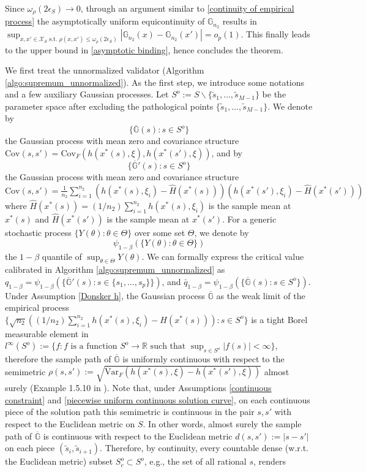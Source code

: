\documentclass[mnsc,blindrev]{informs4} %
\newcommand{\R}{\mathbb{R}}
\newcommand{\abs}[1]{\left \vert #1 \right\vert}
\begin{document}
Since $\omega_{\rho}(2\epsilon_S)\to 0$, through an argument similar to \eqref{continuity of empirical process} the asymptotically uniform equicontinuity of $\mathbb G_{n_2}$ results in $\sup_{x,x'\in\mathcal X_S\text{ s.t. }\rho(x,x')\leq \omega_{\rho}(2\epsilon_S)}\abs{\mathbb G_{n_2}(x)-\mathbb G_{n_2}(x')}=o_p(1)$. This finally leads to the upper bound in \eqref{asymptotic binding}, hence concludes the theorem.\hfill\Halmos

We first treat the unnormalized validator (Algorithm \ref{algo:supremum_unnormalized}). As the first step, we introduce some notations and a few auxiliary Gaussian processes. Let $S^o:=S\backslash\{\tilde s_1,\ldots,\tilde s_{M-1}\}$ be the parameter space after excluding the pathological points $\{\tilde s_1,\ldots,\tilde s_{M-1}\}$. We denote by
$$\{\overline{\mathbb G}(s):s\in S^o\}$$
the Gaussian process with mean zero and covariance structure $\mathrm{Cov}(s,s')=\mathrm{Cov}_F(h(x^*(s),\xi),h(x^*(s'),\xi))$, and by
$$\{\overline{\mathbb G}'(s):s\in S^o\}$$
the Gaussian process with mean zero and covariance structure $\mathrm{Cov}(s,s')=\frac{1}{n_2}\sum_{i=1}^{n_2}(h(x^*(s),\xi_i)-\hat H(x^*(s)))(h(x^*(s'),\xi_i)-\hat H(x^*(s')))$ where $\hat H(x^*(s))=(1/n_2)\sum_{i=1}^{n_2}h(x^*(s),\xi_i)$ is the sample mean at $x^*(s)$ and $\hat H(x^*(s'))$ is the sample mean at $x^*(s')$. For a generic stochastic process $\{Y(\theta):\theta\in\Theta\}$ over some set $\Theta$, we denote by
$$\psi_{1-\beta}(\{Y(\theta):\theta\in\Theta\})$$
the $1-\beta$ quantile of $\sup_{\theta\in \Theta}Y(\theta)$. We can formally express the critical value calibrated in Algorithm \ref{algo:supremum_unnormalized} as $q_{1-\beta}=\psi_{1-\beta}(\{\overline{\mathbb G}'(s):s\in \{s_1,\ldots,s_p\}\})$, and $\bar{q}_{1-\beta}=\psi_{1-\beta}(\{\overline{\mathbb G}(s):s\in S^o\})$. Under Assumption \ref{Donsker h}, the Gaussian process $\overline{\mathbb G}$ as the weak limit of the empirical process $\{\sqrt{n_2}((1/n_2)\sum_{i=1}^{n_2}h(x^*(s),\xi_i)-H(x^*(s))):s\in S^o\}$ is a tight Borel measurable element in $l^{\infty}(S^o):=\{f:f\text{ is a function }S^o\to \R\text{ such that }\sup_{s\in S^o}\lvert f(s)\rvert< \infty\}$, therefore the sample path of $\overline{\mathbb G}$ is uniformly continuous with respect to the semimetric $\rho(s,s'):=\sqrt{\mathrm{Var}_F(h(x^*(s),\xi)-h(x^*(s'),\xi))}$ almost surely (Example 1.5.10 in \cite{van1996weak}). Note that, under Assumptions \ref{continuous constraint} and \ref{piecewise uniform continuous solution curve}, on each continuous piece of the solution path this semimetric is continuous in the pair $s,s'$ with respect to the Euclidean metric on $S$. In other words, almost surely the sample path of $\overline{\mathbb G}$ is continuous with respect to the Euclidean metric $d(s,s'):=\lvert s-s'\rvert$ on each piece $(\tilde s_i,\tilde s_{i+1})$. Therefore, by continuity, every countable dense (w.r.t. the Euclidean metric) subset $S^o_c\subset S^o$, e.g., the set of all rational $s$, renders
\end{document}
